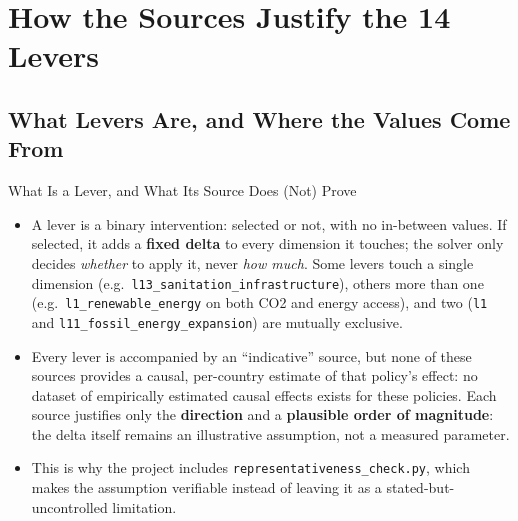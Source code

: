 \documentclass[11pt,aspectratio=169]{beamer}
\begin{document}
\section[The 14 Levers]{How the Sources Justify the 14 Levers}

\subsection{What Levers Are, and Where the Values Come From}
\begin{frame}{What Is a Lever, and What Its Source Does (Not) Prove}
  \footnotesize
  \begin{itemize}
    \item A lever is a \alert{binary intervention}: selected or not, with no in-between values. If selected, it adds a \textbf{fixed delta} to every dimension it touches; the solver only decides \emph{whether} to apply it, never \emph{how much}. Some levers touch a single dimension (e.g.\ \texttt{l13\_sanitation\_infrastructure}), others more than one (e.g.\ \texttt{l1\_renewable\_energy} on both CO2 and energy access), and two (\texttt{l1} and \texttt{l11\_fossil\_energy\_expansion}) are \alert{mutually exclusive}.
    \item Every lever is accompanied by an ``indicative'' source, but \alert{none of these sources provides a causal, per-country estimate} of that policy's effect: no dataset of empirically estimated causal effects exists for these policies. Each source justifies only the \textbf{direction} and a \textbf{plausible order of magnitude}: the delta itself remains an illustrative assumption, not a measured parameter.
    \item This is why the project includes \texttt{representativeness\_check.py}, which makes the assumption \alert{verifiable} instead of leaving it as a stated-but-uncontrolled limitation.
  \end{itemize}
\end{frame}
\end{document}
